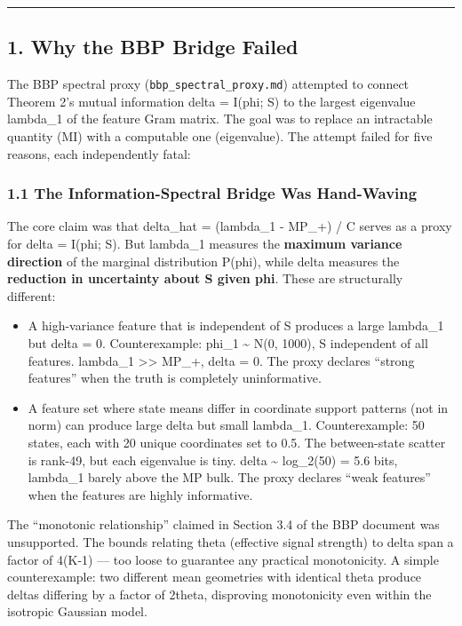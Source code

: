 \documentclass[
  12pt,
]{ctexart}
\begin{document}
\begin{center}\rule{0.5\linewidth}{0.5pt}\end{center}

\subsection{1. Why the BBP Bridge
Failed}\label{why-the-bbp-bridge-failed}

The BBP spectral proxy (\texttt{bbp\_spectral\_proxy.md}) attempted to
connect Theorem 2's mutual information delta = I(phi; S) to the largest
eigenvalue lambda\_1 of the feature Gram matrix. The goal was to replace
an intractable quantity (MI) with a computable one (eigenvalue). The
attempt failed for five reasons, each independently fatal:

\subsubsection{1.1 The Information-Spectral Bridge Was
Hand-Waving}\label{the-information-spectral-bridge-was-hand-waving}

The core claim was that delta\_hat = (lambda\_1 - MP\_+) / C serves as a
proxy for delta = I(phi; S). But lambda\_1 measures the \textbf{maximum
variance direction} of the marginal distribution P(phi), while delta
measures the \textbf{reduction in uncertainty about S given phi}. These
are structurally different:

\begin{itemize}
\item
  A high-variance feature that is independent of S produces a large
  lambda\_1 but delta = 0. Counterexample: phi\_1 \textasciitilde{} N(0,
  1000), S independent of all features. lambda\_1
  \textgreater\textgreater{} MP\_+, delta = 0. The proxy declares
  ``strong features'' when the truth is completely uninformative.
\item
  A feature set where state means differ in coordinate support patterns
  (not in norm) can produce large delta but small lambda\_1.
  Counterexample: 50 states, each with 20 unique coordinates set to 0.5.
  The between-state scatter is rank-49, but each eigenvalue is tiny.
  delta \textasciitilde{} log\_2(50) = 5.6 bits, lambda\_1 barely above
  the MP bulk. The proxy declares ``weak features'' when the features
  are highly informative.
\end{itemize}

The ``monotonic relationship'' claimed in Section 3.4 of the BBP
document was unsupported. The bounds relating theta (effective signal
strength) to delta span a factor of 4(K-1) --- too loose to guarantee
any practical monotonicity. A simple counterexample: two different mean
geometries with identical theta produce deltas differing by a factor of
2theta, disproving monotonicity even within the isotropic Gaussian
model.
\end{document}
